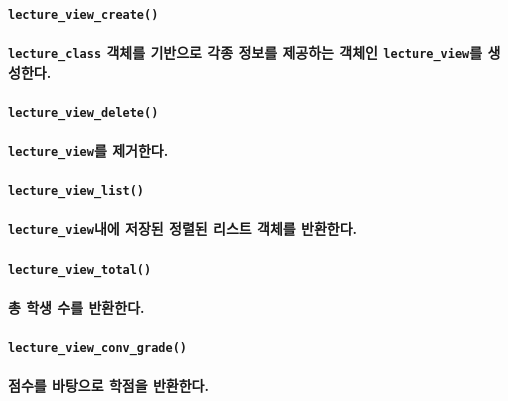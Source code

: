 \documentclass[UTF8]{report}
\begin{document}
            \paragraph{\texttt{lecture\_view\_create()}}
            \paragraph{%
                \normalfont \texttt{lecture\_class} 객체를 기반으로 각종 정보를 제공하는 객체인 \texttt{lecture\_view}를 생성한다.
            }

            \paragraph{\texttt{lecture\_view\_delete()}}
            \paragraph{%
                \normalfont  \texttt{lecture\_view}를 제거한다.
            }

            \paragraph{\texttt{lecture\_view\_list()}}
            \paragraph{%
                \normalfont  \texttt{lecture\_view}내에 저장된 정렬된 리스트 객체를 반환한다.
            }

            \paragraph{\texttt{lecture\_view\_total()}}
            \paragraph{%
                \normalfont  총 학생 수를 반환한다.
            }

            \paragraph{\texttt{lecture\_view\_conv\_grade()}}
            \paragraph{%
                \normalfont  점수를 바탕으로 학점을 반환한다.
            }
\end{document}
